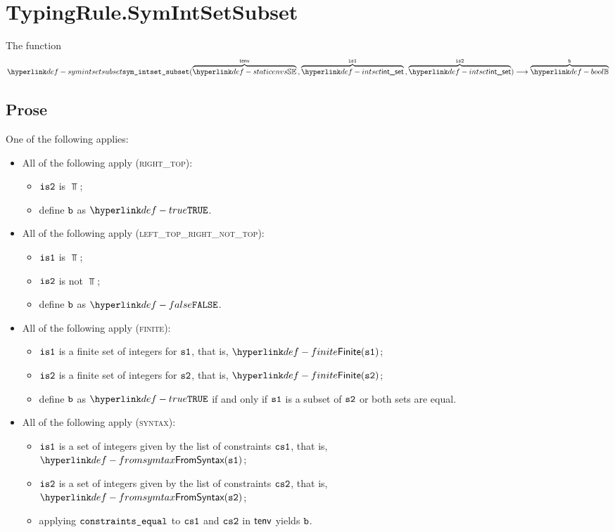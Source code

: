 \section{TypingRule.SymIntSetSubset \label{sec:TypingRule.SymIntSetSubset}}
\hypertarget{def-symintsetsubset}{}
The function
\[
\symintsetsubset(\overname{\staticenvs}{\tenv} \aslsep \overname{\intset}{\visone} \aslsep \overname{\intset}{\vistwo}) \aslto \overname{\Bool}{\vb}
\]

\subsection{Prose}
One of the following applies:
\begin{itemize}
  \item All of the following apply (\textsc{right\_top}):
  \begin{itemize}
    \item $\texttt{is2}$ is $\Top$;
    \item define $\texttt{b}$ as $\True$.
  \end{itemize}

  \item All of the following apply (\textsc{left\_top\_right\_not\_top}):
  \begin{itemize}
    \item $\texttt{is1}$ is $\Top$;
    \item $\texttt{is2}$ is not $\Top$;
    \item define $\texttt{b}$ as $\False$.
  \end{itemize}

  \item All of the following apply (\textsc{finite}):
  \begin{itemize}
    \item $\texttt{is1}$ is a finite set of integers for $\texttt{s1}$, that is, $\Finite(\vsone)$;
    \item $\texttt{is2}$ is a finite set of integers for $\texttt{s2}$, that is, $\Finite(\vstwo)$;
    \item define $\texttt{b}$ as $\True$ if and only if $\texttt{s1}$ is a subset of $\texttt{s2}$ or both sets are equal.
  \end{itemize}

  \item All of the following apply (\textsc{syntax}):
  \begin{itemize}
    \item $\texttt{is1}$ is a set of integers given by the list of constraints $\texttt{cs1}$, that is, \\ $\FromSyntax(\vsone)$;
    \item $\texttt{is2}$ is a set of integers given by the list of constraints $\texttt{cs2}$, that is, \\ $\FromSyntax(\vstwo)$;
    \item applying $\texttt{constraints\_equal}$ to $\texttt{cs1}$ and $\texttt{cs2}$ in $\textsf{tenv}$ yields $\texttt{b}$.
  \end{itemize}


\end{itemize}
